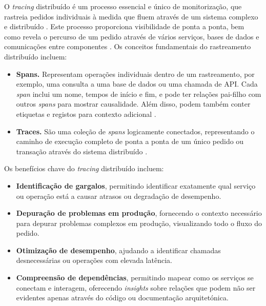 O \textit{tracing} distribuído é um processo essencial e único de monitorização, que rastreia pedidos individuais à medida que fluem através de um sistema complexo e distribuído \cite{Sambasivan2014}. Este processo proporciona visibilidade de ponta a ponta, bem como revela o percurso de um pedido através de vários serviços, bases de dados e comunicações entre componentes \cite{Zhang2023}. Os conceitos fundamentais do rastreamento distribuído incluem:

\begin{itemize}
    \item \textbf{Spans.} Representam operações individuais dentro de um rastreamento, por exemplo, uma consulta a uma base de dados ou uma chamada de API. Cada \textit{span} inclui um nome, tempos de início e fim, e pode ter relações pai-filho com outros \textit{spans} para mostrar causalidade. Além disso, podem também conter etiquetas e registos para contexto adicional \cite{Sambasivan2014}.

    \item \textbf{Traces.} São uma coleção de \textit{spans} logicamente conectados, representando o caminho de execução completo de ponta a ponta de um único pedido ou transação através do sistema distribuído \cite{Sambasivan2014}.
\end{itemize}

Os benefícios chave do \textit{tracing} distribuído incluem:

\begin{itemize}
    \item \textbf{Identificação de gargalos}, permitindo identificar exatamente qual serviço ou operação está a causar atrasos ou degradação de desempenho.

    \item \textbf{Depuração de problemas em produção}, fornecendo o contexto necessário para depurar problemas complexos em produção, visualizando todo o fluxo do pedido.

    \item \textbf{Otimização de desempenho}, ajudando a identificar chamadas desnecessárias ou operações com elevada latência.

    \item \textbf{Compreensão de dependências}, permitindo mapear como os serviços se conectam e interagem, oferecendo \textit{insights} sobre relações que podem não ser evidentes apenas através do código ou documentação arquitetónica.
\end{itemize}

